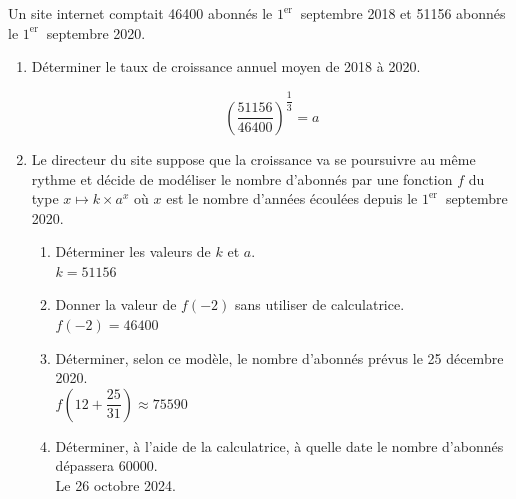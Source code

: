 \documentclass[french]{book}
\begin{document}
\begin{corrige}
Un site internet comptait 46400 abonnés le $1^{\text {er }}$ septembre 2018 et 51156 abonnés le $1^{\text {er }}$ septembre 2020.

\begin{enumerate}
\item Déterminer le taux de croissance annuel moyen de 2018 à 2020.

$$(\dfrac{51156}{46400})^\dfrac{1}{3}=a$$

\item Le directeur du site suppose que la croissance va se poursuivre au même rythme et décide de modéliser le nombre d'abonnés par une fonction $f$ du type $x \mapsto k \times a^{x}$ où $x$ est le nombre d'années écoulées depuis le $1^{\text {er }}$ septembre 2020.

\begin{enumerate}
\item Déterminer les valeurs de $k$ et $a$.\\

$k=51156$
\item Donner la valeur de $f(-2)$ sans utiliser de calculatrice.\\

$f(-2)=46400$
\item Déterminer, selon ce modèle, le nombre d'abonnés prévus le 25 décembre 2020.\\

$f(12+\dfrac{25}{31})\approx 75590$

\item Déterminer, à l'aide de la calculatrice, à quelle date le nombre d'abonnés dépassera 60000. \\

Le 26 octobre 2024.
\end{enumerate}
\end{enumerate}
\end{corrige}
\end{document}

